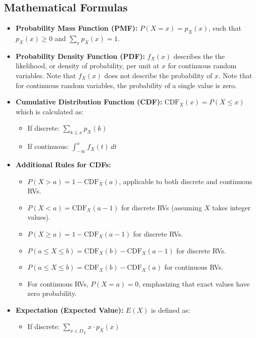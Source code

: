 \documentclass{article}
\begin{document}
\subsection*{Mathematical Formulas}
\begin{itemize}
    \item \textbf{Probability Mass Function (PMF):} \( P(X = x) = p_X(x) \), such that \( p_X(x) \geq 0 \) and \( \sum_x p_X(x) = 1 \).
    \item \textbf{Probability Density Function (PDF):} \( f_X(x) \) describes the the likelihood, or density of probability, per unit at \( x \) for continuous random variables. Note that $f_X(x)$ does not describe the probability of $x$. Note that for continuous random variables, the probability of a single value is zero. 
    \item \textbf{Cumulative Distribution Function (CDF):} \( \text{CDF}_X(x) = P(X \leq x) \) which is calculated as:
        \begin{itemize}
            \item If discrete: \( \sum_{k \leq x} p_X(k) \)
            \item If continuous: \( \int_{-\infty}^x f_X(t) \, dt \)
        \end{itemize}
    \item \textbf{Additional Rules for CDFs:}
        \begin{itemize}
            \item \( P(X > a) = 1 - \text{CDF}_X(a) \), applicable to both discrete and continuous RVs.
            \item \( P(X < a) = \text{CDF}_X(a-1) \) for discrete RVs (assuming \(X\) takes integer values).
            \item \( P(X \geq a) = 1 - \text{CDF}_X(a-1) \) for discrete RVs.
            \item \( P(a \leq X \leq b) = \text{CDF}_X(b) - \text{CDF}_X(a-1) \) for discrete RVs.
            \item \( P(a \leq X \leq b) = \text{CDF}_X(b) - \text{CDF}_X(a) \) for continuous RVs.
            \item For continuous RVs, \( P(X = a) = 0 \), emphasizing that exact values have zero probability.
        \end{itemize}
    \item \textbf{Expectation (Expected Value):} \( E(X) \) is defined as:
        \begin{itemize}
            \item If discrete: \( \sum_{x \in D_X} x \cdot p_X(x) \)

\end{itemize}
\end{itemize}
\end{document}
